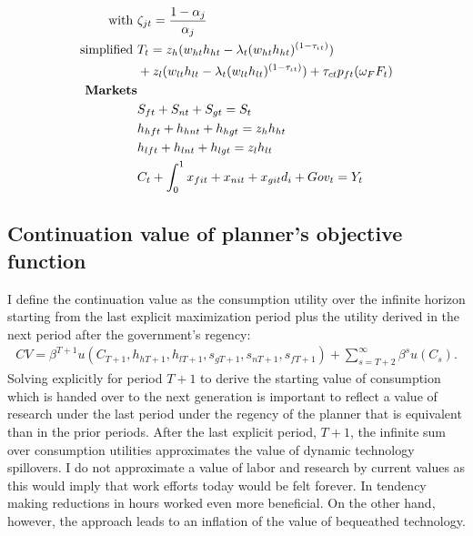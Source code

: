 \begin{align*}
\text{with}\ \vspace{4mm}&\zeta_{jt}=\frac{1-\alpha_j}{\alpha_j} \\
\text{simplified}\ \vspace{4mm} & T_t= z_h(w_{ht}h_{ht}-\lambda_t(w_{ht}h_{ht})^{(1-\tau_{\iota t})})\\&+z_l(w_{lt}h_{lt}-\lambda_t(w_{lt}h_{lt})^{(1-\tau_{\iota t})})+\tau_{ct}p_{ft}(\omega_FF_t) \\
\text{\textbf{Markets}}&\\
& S_{ft}+ S_{nt}+ S_{gt}=S_t\\
&h_{hft}+h_{hnt}+h_{hgt}=z_{h} h_{ht}\\
&h_{lft}+h_{lnt}+h_{lgt}=z_{l} h_{lt}\\
&C_{t}+\int_{0}^{1} x_{fit}+x_{nit}+x_{git}d_i+Gov_t=Y_t
\end{align*}

\subsection{Continuation value of planner's objective function}\label{app:PV}
I define the continuation value as the consumption utility over the infinite horizon starting from the last explicit maximization period plus the utility derived in the next period after the government's regency:
\begin{align}
CV=\beta^{T+1} u(C_{T+1},h_{h{T+1}}, h_{l{T+1}}, s_{g{T+1}}, s_{n{T+1}}, s_{f{T+1}})+\sum_{s=T+2}^{\infty} \beta^{s}u(C_s). %
\end{align}
Solving explicitly for period $T+1$ to derive the starting value of consumption which is handed over to the next generation is important to reflect a value of research under the last period under the regency of the planner that is equivalent than in the prior periods.
After the last explicit period, $T+1$, the infinite sum over consumption utilities approximates the value of dynamic technology spillovers. 
I do not approximate a value of labor and research by current values as this would imply that work efforts today would be felt forever. In tendency making reductions in hours worked even more beneficial. On the other hand, however, the approach leads to an inflation of the value of bequeathed technology. 

